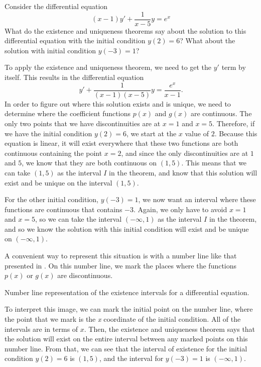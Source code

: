 \documentclass{ximera}
\begin{document}
\begin{example}
    Consider the differential equation 
    \begin{equation*}
        (x-1)y' + \frac{1}{x-5} y = e^x
    \end{equation*}
    What do the existence and uniqueness theorems say about the solution to this differential equation with the initial condition $y(2) = 6$? What about the solution with initial condition $y(-3) = 1$?
\end{example}

\begin{exampleSol}
    To apply the existence and uniqueness theorem, we need to get the $y'$ term by itself. This results in the differential equation
    \begin{equation*}
        y' + \frac{1}{(x-1)(x-5)} y = \frac{e^x}{x-1}.
    \end{equation*}
    In order to figure out where this solution exists and is unique, we need to determine where the coefficient functions $p(x)$ and $g(x)$ are continuous. The only two points that we have discontinuities are at $x=1$ and $x=5$. Therefore, if we have the initial condition $y(2) = 6$, we start at the $x$ value of $2$. Because this equation is linear, it will exist everywhere that these two functions are both continuous containing the point $x=2$, and since the only discontinuities are at $1$ and $5$, we know that they are both continuous on $(1,5)$. This means that we can take $(1,5)$ as the interval $I$ in the theorem, and know that this solution will exist and be unique on the interval $(1,5)$. 
    
    For the other initial condition, $y(-3) = 1$, we now want an interval where these functions are continuous that contains $-3$. Again, we only have to avoid $x=1$ and $x=5$, so we can take the interval $(-\infty, 1)$ as the interval $I$ in the theorem, and so we know the solution with this initial condition will exist and be unique on $(-\infty, 1)$. 
    
    A convenient way to represent this situation is with a number line like that presented in . On this number line, we mark the places where the functions $p(x)$ or $g(x)$ are discontinuous. 
    
    \begin{myfig}
        \capstart
        \caption{Number line representation of the existence intervals for a differential equation.\label{1.5:EUNumberLine}}
    \end{myfig}
    
    To interpret this image, we can mark the initial point on the number line, where the point that we mark is the \emph{x} coordinate of the initial condition. All of the intervals are in terms of $x$. Then, the existence and uniqueness theorem says that the solution will exist on the entire interval between any marked points on this number line. From that, we can see that the interval of existence for the initial condition $y(2) = 6$ is $(1,5)$, and the interval for $y(-3) = 1$ is $(-\infty, 1)$. 
\end{exampleSol}
\end{document}
